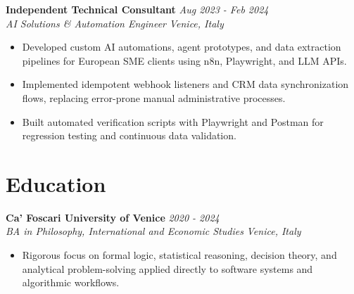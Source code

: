 \documentclass[10pt,a4paper]{article}
\newcommand{\role}[4]{
  \vspace{2pt}
  \noindent\textbf{#1} \hfill \textit{#2} \\
  \textit{\color{text}#3} \hfill \textit{\color{text}#4}
  \vspace{1pt}
}
\begin{document}
\role{Independent Technical Consultant}{Aug 2023 - Feb 2024}{AI Solutions \& Automation Engineer}{Venice, Italy}
\begin{itemize}
  \item Developed custom AI automations, agent prototypes, and data extraction pipelines for European SME clients using n8n, Playwright, and LLM APIs.
  \item Implemented idempotent webhook listeners and CRM data synchronization flows, replacing error-prone manual administrative processes.
  \item Built automated verification scripts with Playwright and Postman for regression testing and continuous data validation.
\end{itemize}

\section{Education}

\role{Ca' Foscari University of Venice}{2020 - 2024}{BA in Philosophy, International and Economic Studies}{Venice, Italy}
\begin{itemize}
  \item Rigorous focus on formal logic, statistical reasoning, decision theory, and analytical problem-solving applied directly to software systems and algorithmic workflows.
\end{itemize}
\end{document}
